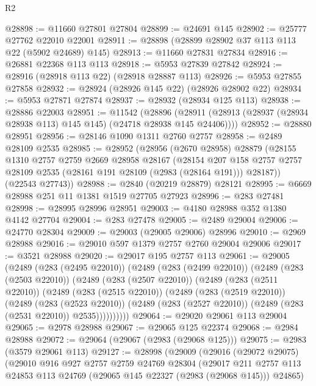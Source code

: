 \begin{lexlean}{R2}
\begin{coremodule}
@28898 := @11660 @27801 @27804
@28899 := @24691 @145
@28902 := @25777 @27762 @22010 @22001
@28911 := @28898 (@28899 @28902 @37 @113 @113 @22 (@5902 @24689) @145)
@28913 := @11660 @27831 @27834
@28916 := @26881 @22368 @113 @113
@28918 := @5953 @27839 @27842
@28924 := @28916 (@28918 @113 @22) (@28918 @28887 @113)
@28926 := @5953 @27855 @27858
@28932 := @28924 (@28926 @145 @22) (@28926 @28902 @22)
@28934 := @5953 @27871 @27874
@28937 := @28932 (@28934 @125 @113)
@28938 := @28886 @22003
@28951 := @11542
    (@28896 (@28911 (@28913 (@28937 (@28934 @28938 @113) @145 @145) (@24718 @28938 @145 @24406))))
@28952 := @28880 @28951
@28956 := @28146 @1090 @1311 @2760 @2757
@28958 := @2489 @28109 @2535
@28985 := @28952
    (@28956
      (@2670 @28958)
      @28879
      (@28155
        @1310
        @2757
        @2759
        @2669
        @28958
        @28167
        (@28154
          @207
          @158
          @2757
          @2757
          @28109
          @2535
          (@28161 @191 @28109 (@2983 (@28164 @191)))
          @28187))
      (@22543 @27743))
@28988 := @2840 (@20219 @28879) @28121
@28995 := @6669 @28988 @251 @11 @1381 @1519 @27705 @27923
@28996 := @283 @27481
@28998 := @28995 @28996 @28951
@29003 := @4180 @28988 @352 @1380 @4142 @27704
@29004 := @283 @27478
@29005 := @2489 @29004
@29006 := @24770 @28304
@29009 := @29003 (@29005 @29006) @28996
@29010 := @2969 @28988
@29016 := @29010 @597 @1379 @2757 @2760 @29004 @29006
@29017 := @3521 @28988
@29020 := @29017 @195 @2757 @113
@29061 := @29005
    (@2489
      (@283 (@2495 @22010))
      (@2489
        (@283 (@2499 @22010))
        (@2489
          (@283 (@2503 @22010))
          (@2489
            (@283 (@2507 @22010))
            (@2489
              (@283 (@2511 @22010))
              (@2489
                (@283 (@2515 @22010))
                (@2489
                  (@283 (@2519 @22010))
                  (@2489
                    (@283 (@2523 @22010))
                    (@2489 (@283 (@2527 @22010)) (@2489 (@283 (@2531 @22010)) @2535))))))))))
@29064 := @29020 @29061 @113 @29004
@29065 := @2978 @28988
@29067 := @29065 @125 @22374
@29068 := @2984 @28988
@29072 := @29064 (@29067 (@2983 (@29068 @125)))
@29075 := @2983 (@3579 @29061 @113)
@29127 := @28998
    (@29009
      (@29016
        (@29072 @29075)
        (@29010
          @916
          @927
          @2757
          @2759
          @24769
          @28304
          (@29017
            @211
            @2757
            @113
            @24853
            @113
            @24769
            (@29065 @145 @22327 (@2983 (@29068 @145)))
            @24865)

\end{coremodule}
\end{lexlean}
